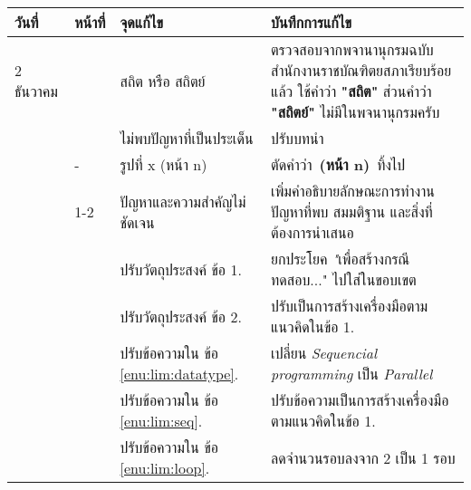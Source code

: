 \begin{table}[ht!]
    \centering
    \begin{tabularx}{\textwidth}{|l|l|l|X|}
        \hline
        \rowcolor{LightGray} 
        {\bf วันที่}   & {\bf หน้าที่}                    & {\bf จุดแก้ไข}          & {\bf บันทึกการแก้ไข} \\ \hline
        2 ธันวาคม    & \pageref{sec:introduction}    & สถิต หรือ สถิตย์          & ตรวจสอบจากพจานานุกรมฉบับสำนักงานราชบัณฑิตยสภาเรียบร้อยแล้ว 
                                                            ใช้คำว่า {\bf "สถิต"} ส่วนคำว่า {\bf "สถิตย์"} ไม่มีในพจนานุกรมครับ \\ \hline
                    &  \pageref{sec:introduction}   & ไม่พบปัญหาที่เป็นประเด็น    & ปรับบทนำ \\ \hline
                    & -                             & รูปที่ x (หน้า n)         & ตัดคำว่า\ {\bf (หน้า n)}\ ทิ้งไป \\ \hline
                    & 1-2                           & ปัญหาและความสำคัญไม่ชัดเจน& เพิ่มคำอธิบายลักษณะการทำงาน ปัญหาที่พบ 
                                                            สมมติฐาน และสิ่งที่ต้องการนำเสนอ \\ \hline
                    & \pageref{sec:objective}       & ปรับวัตถุประสงค์ ข้อ 1.    & ยกประโยค {\textit "เพื่อสร้างกรณีทดสอบ..."} 
                                                            ไปใส่ในขอบเขต \\ \hline 
                    & \pageref{sec:objective}       & ปรับวัตถุประสงค์ ข้อ 2.    & ปรับเป็นการสร้างเครื่องมือตามแนวคิดในข้อ 1. \\ \hline
                    & \pageref{sec:limitation}      & ปรับข้อความใน ข้อ \ref{enu:lim:datatype}.    & เปลี่ยน {\it Sequencial programming} 
                                                            เป็น {\it Parallel} \\ \hline
                    & \pageref{sec:limitation}      & ปรับข้อความใน ข้อ \ref{enu:lim:seq}.         & ปรับข้อความเป็นการสร้างเครื่องมือตามแนวคิดในข้อ 1. \\ \hline
                    & \pageref{sec:limitation}      & ปรับข้อความใน ข้อ \ref{enu:lim:loop}.        & ลดจำนวนรอบลงจาก 2 เป็น 1 รอบ \\ \hline
    \end{tabularx}
\end{table}
